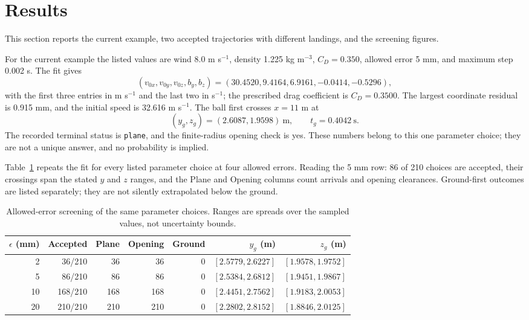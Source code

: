 \documentclass[11pt,a4paper]{article}
\begin{document}
\section{Results}
This section reports the current example, two accepted trajectories with different landings, and the screening figures.

For the current example the listed values are wind 8.0 m s$^{-1}$, density 1.225 kg m$^{-3}$, $C_D=0.350$, allowed error 5 mm, and maximum step 0.002 s. The fit gives
\begin{equation}
(v_{0x},v_{0y},v_{0z},b_y,b_z)=(30.4520, 9.4164, 6.9161, -0.0414, -0.5296),
\end{equation}
with the first three entries in m s$^{-1}$ and the last two in s$^{-1}$; the prescribed drag coefficient is $C_D=0.3500$. The largest coordinate residual is 0.915 mm, and the initial speed is 32.616 m s$^{-1}$. The ball first crosses $x=11$ m at
\begin{equation}
(y_g,z_g)=(2.6087,1.9598)\ \mathrm m,
\qquad t_g=0.4042\ \mathrm s.
\end{equation}
The recorded terminal status is \texttt{plane}, and the finite-radius opening check is yes. These numbers belong to this one parameter choice; they are not a unique answer, and no probability is implied.

Table~\ref{tab:tol} repeats the fit for every listed parameter choice at four allowed errors. Reading the 5 mm row: 86 of 210 choices are accepted, their crossings span the stated $y$ and $z$ ranges, and the Plane and Opening columns count arrivals and opening clearances. Ground-first outcomes are listed separately; they are not silently extrapolated below the ground.
\begin{table}[H]\centering
\caption{Allowed-error screening of the same parameter choices. Ranges are spreads over the sampled values, not uncertainty bounds.}
\label{tab:tol}
\begin{tabular}{rrrrrrr}\toprule
$\epsilon$ (mm) & Accepted & Plane & Opening & Ground & $y_g$ (m) & $z_g$ (m)\\\midrule
2 & 36/210 & 36 & 36 & 0 & $[2.5779,2.6227]$ & $[1.9578,1.9752]$ \\
5 & 86/210 & 86 & 86 & 0 & $[2.5384,2.6812]$ & $[1.9451,1.9867]$ \\
10 & 168/210 & 168 & 168 & 0 & $[2.4451,2.7562]$ & $[1.9183,2.0053]$ \\
20 & 210/210 & 210 & 210 & 0 & $[2.2802,2.8152]$ & $[1.8846,2.0125]$ \\
\bottomrule\end{tabular}\end{table}
\end{document}
